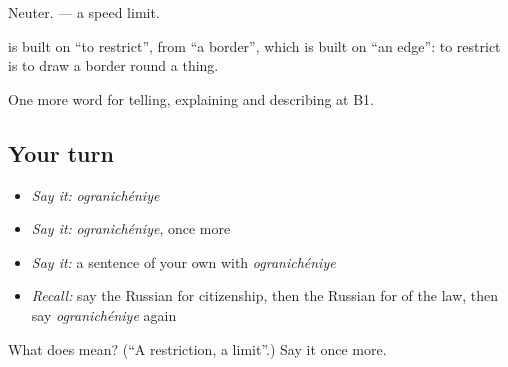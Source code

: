 Neuter. \emph{ } — a speed limit.

\begin{cousinweb}
\textbf{} is built on \emph{} \textquotedblleft{}to restrict\textquotedblright{}, from \emph{} \textquotedblleft{}a border\textquotedblright{}, which is built on \emph{} \textquotedblleft{}an edge\textquotedblright{}: to restrict is to draw a border round a thing.
\end{cousinweb}

\begin{grammarlens}[title={What you've built}]
One more word for telling, explaining and describing at B1.
\end{grammarlens}

\subsection*{Your turn}
\begin{itemize}
\raggedright
  \item \emph{Say it:} \emph{ogranichéniye}
  \item \emph{Say it:} \emph{ogranichéniye}, once more
  \item \emph{Say it:} a sentence of your own with \emph{ogranichéniye}
  \item \emph{Recall:} say the Russian for citizenship, then the Russian for of the law, then say \emph{ogranichéniye} again
\end{itemize}

\begin{tcolorbox}[breakable,colback=teal!4,colframe=teal!35!black,title={Before you move on}]
What does  mean? (\textquotedblleft{}A restriction, a limit\textquotedblright{}.) Say it once more.
\end{tcolorbox}
